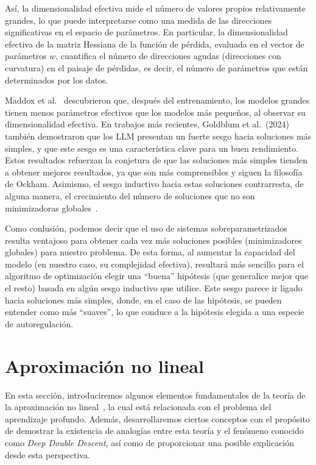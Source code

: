 Así, la dimensionalidad efectiva mide el número de valores propios relativamente grandes, lo que puede interpretarse como una medida de las direcciones significativas en el espacio de parámetros. En particular, la dimensionalidad efectiva de la matriz Hessiana de la función de pérdida, evaluada en el vector de parámetros $w$, cuantifica el número de direcciones agudas (direcciones con curvatura) en el paisaje de pérdidas, es decir, el número de parámetros que están determinados por los datos.\newline

Maddox et al.~\cite{Maddox2020} descubrieron que, después del entrenamiento, los modelos grandes tienen menos parámetros efectivos que los modelos más pequeños, al observar su dimensionalidad efectiva. En trabajos más recientes, Goldblum et al.~(2024)~\cite{Goldblum2024} también demostraron que los LLM presentan un fuerte sesgo hacia soluciones más simples, y que este sesgo es una característica clave para un buen rendimiento. Estos resultados refuerzan la conjetura de que las soluciones más simples tienden a obtener mejores resultados, ya que son más comprensibles y siguen la filosofía de Ockham. Asimismo, el sesgo inductivo hacia estas soluciones contrarresta, de alguna manera, el crecimiento del número de soluciones que no son minimizadoras globales~\cite{Mingard2023}.\newline

Como conlusión, podemos decir que el uso de sistemas sobreparametrizados resulta ventajoso para obtener cada vez más soluciones posibles (minimizadores globales) para nuestro problema. De esta forma, al aumentar la capacidad del modelo (en nuestro caso, su complejidad efectiva), resultará más sencillo para el algoritmo de optimización elegir una ``buena'' hipótesis (que generalice mejor que el resto) basada en algún sesgo inductivo que utilice. Este sesgo parece ir ligado hacia soluciones más simples, donde, en el caso de las hipótesis, se pueden entender como más ``suaves'', lo que conduce a la hipótesis elegida a una especie de autoregulación.\newline

\section{Aproximación no lineal}\label{sec:aproximacion-no-lineal}

En esta sección, introduciremos algunos elementos fundamentales de la teoría de la aproximación no lineal~\cite{DeVore1998}, la cual está relacionada con el problema del aprendizaje profundo. Además, desarrollaremos ciertos conceptos con el propósito de demostrar la existencia de analogías entre esta teoría y el fenómeno conocido como \textit{Deep Double Descent}, así como de proporcionar una posible explicación desde esta perspectiva.\newline

